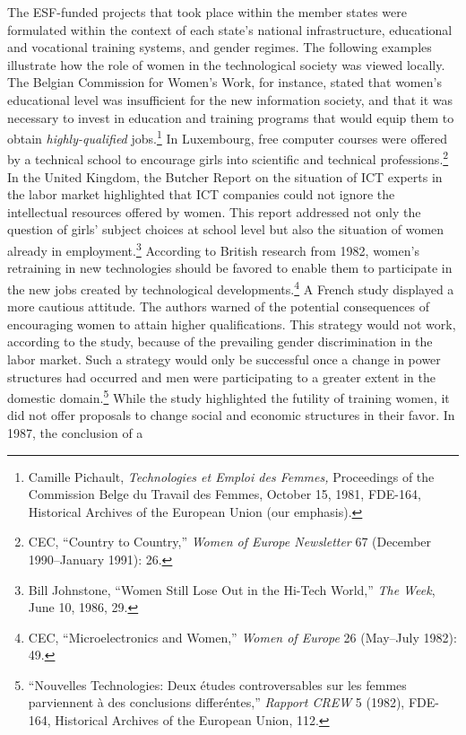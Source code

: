 \documentclass{tufte-handout}
\begin{document}
The ESF-funded projects that took place within the member states were
formulated within the context of each state's national infrastructure,
educational and vocational training systems, and gender regimes. The
following examples illustrate how the role of women in the technological
society was viewed locally. The Belgian Commission for Women's Work, for
instance, stated that women's educational level was insufficient for the
new information society, and that it was necessary to invest in
education and training programs that would equip them to obtain
\emph{highly-qualified} jobs.\footnote{Camille Pichault,
  \emph{Technologies et Emploi des Femmes,} Proceedings of the
  Commission Belge du Travail des Femmes, October 15, 1981, FDE-164,
  Historical Archives of the European Union (our emphasis).} In
Luxembourg, free computer courses were offered by a technical school to
encourage girls into scientific and technical professions.\footnote{CEC,
  ``Country to Country,'' \emph{Women of Europe Newsletter} 67 (December
  1990--January 1991): 26.} In the United Kingdom, the Butcher Report on
the situation of ICT experts in the labor market highlighted that ICT
companies could not ignore the intellectual resources offered by women.
This report addressed not only the question of girls' subject choices at
school level but also the situation of women already in
employment.\footnote{Bill Johnstone, ``Women Still Lose Out in the
  Hi-Tech World,'' \emph{The Week}, June 10, 1986, 29.} According to
British research from 1982, women's retraining in new technologies
should be favored to enable them to participate in the new jobs created
by technological developments.\footnote{CEC, ``Microelectronics and
  Women,'' \emph{Women of Europe} 26 (May--July 1982): 49.} A French
study displayed a more cautious attitude. The authors warned of the
potential consequences of encouraging women to attain higher
qualifications. This strategy would not work, according to the study,
because of the prevailing gender discrimination in the labor market.
Such a strategy would only be successful once a change in power
structures had occurred and men were participating to a greater extent
in the domestic domain.\footnote{``Nouvelles Technologies: Deux études
  controversables sur les femmes parviennent à des conclusions
  differéntes,'' \emph{Rapport CREW} 5 (1982), FDE-164, Historical
  Archives of the European Union, 112.} While the study highlighted the
futility of training women, it did not offer proposals to change social
and economic structures in their favor. In 1987, the conclusion of a
\end{document}
